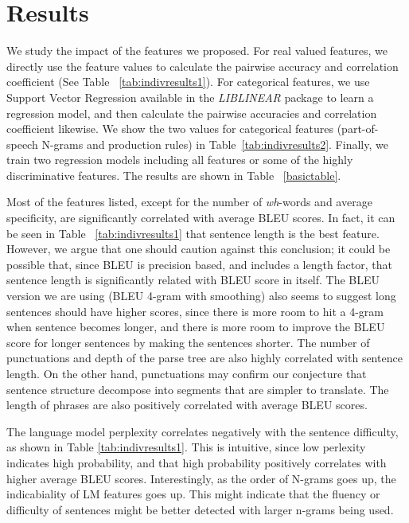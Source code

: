 \documentclass[11pt]{article}
\begin{document}
\section{Results}
We study the impact of the features we proposed. 
For real valued features, we directly use  the feature values to calculate the pairwise accuracy and correlation coefficient (See Table ~\ref{tab:indivresults1}). 
For categorical features, we use Support Vector Regression available in the {\em LIBLINEAR} package \cite{Fan:2008:LLL:1390681.1442794} to learn a regression model, and then calculate the pairwise accuracies and correlation coefficient likewise. 
We show the two values for categorical features (part-of-speech N-grams and production rules) in Table~\ref{tab:indivresults2}.
Finally, we train two regression models including all features or some of the highly discriminative features.
The results are shown in Table ~\ref{basictable}.

Most of the features listed, except for the number of {\em wh}-words and average specificity, are significantly correlated with average BLEU scores. 
In fact, it can be seen in Table ~\ref{tab:indivresults1} that sentence length is the best feature.
However, we argue that one should caution against this conclusion; it could be possible that, since BLEU is precision based, and includes a length factor, that sentence length is significantly related with BLEU score
in itself.  
The BLEU version we are using (BLEU 4-gram with smoothing) also seems to suggest long sentences should have higher scores, 
since there is more room to hit a 4-gram when sentence becomes longer, and there is more room to improve the BLEU score for longer sentences by making the sentences shorter. 
The number of punctuations and depth of the parse tree are also highly correlated with sentence length. On the other hand, punctuations may confirm our conjecture that sentence structure decompose into segments that are simpler to translate. The length of phrases are also positively correlated with average BLEU scores. 

The language model perplexity correlates negatively with the sentence difficulty, as shown in Table \ref{tab:indivresults1}.
This is intuitive, since low perlexity indicates high probability, and that high probability positively correlates with higher average BLEU scores.
Interestingly, as the order of N-grams goes up, the indicabiality of LM features goes up. 
This might indicate that the fluency or difficulty of sentences might be better detected with larger n-grams being used. 
\end{document}
